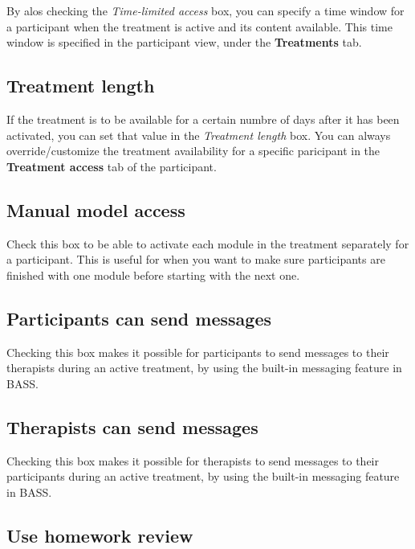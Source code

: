 \documentclass[]{book}
\begin{document}
By alos checking the \emph{Time-limited access} box, you can specify a time window for a participant when the treatment is active and its content available. This time window is specified in the participant view, under the \textbf{Treatments} tab.

\hypertarget{treatment-length}{%
\subsection{Treatment length}\label{treatment-length}}

If the treatment is to be available for a certain numbre of days after it has been activated, you can set that value in the \emph{Treatment length} box. You can always override/customize the treatment availability for a specific paricipant in the \textbf{Treatment access} tab of the participant.

\hypertarget{manual-model-access}{%
\subsection{Manual model access}\label{manual-model-access}}

Check this box to be able to activate each module in the treatment separately for a participant. This is useful for when you want to make sure participants are finished with one module before starting with the next one.

\hypertarget{participants-can-send-messages}{%
\subsection{Participants can send messages}\label{participants-can-send-messages}}

Checking this box makes it possible for participants to send messages to their therapists during an active treatment, by using the built-in messaging feature in BASS.

\hypertarget{therapists-can-send-messages}{%
\subsection{Therapists can send messages}\label{therapists-can-send-messages}}

Checking this box makes it possible for therapists to send messages to their participants during an active treatment, by using the built-in messaging feature in BASS.

\hypertarget{use-homework-review}{%
\subsection{Use homework review}\label{use-homework-review}}
\end{document}
